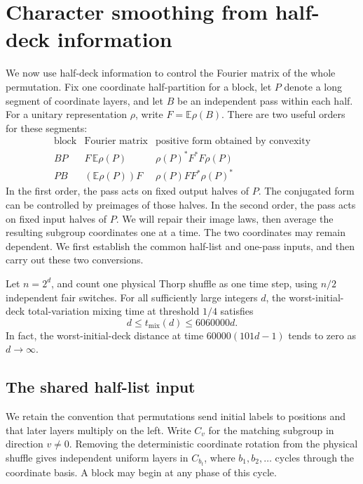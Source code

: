 \section{Character smoothing from half-deck information}
\label{frames:char:section}

We now use half-deck information to control the Fourier matrix of the
whole permutation. Fix one coordinate half-partition for a block, let
$P$ denote a long segment of coordinate layers, and let $B$ be an
independent pass within each half. For a unitary representation $\rho$,
write $F=\mathbb E\rho(B)$. There are two useful orders for these segments:
\[
\begin{array}{c|c|c}
\text{block}&\text{Fourier matrix}&
       \text{positive form obtained by convexity}\\
\hline
BP&F\,\mathbb E\rho(P)&\rho(P)^*F^*F\rho(P)\\
PB&(\mathbb E\rho(P))F&\rho(P)FF^*\rho(P)^*
\end{array}
\]
In the first order, the pass acts on fixed output halves of $P$.
The conjugated form can be controlled by preimages of those halves.
In the second order, the pass acts on fixed input halves of $P$.
We will repair their image laws, then average the resulting subgroup
coordinates one at a time. The two coordinates may remain dependent.
We first establish the common half-list and one-pass inputs, and then
carry out these two conversions.

\begin{theorem}\label{frames:char:main}
Let $n=2^d$, and count one physical Thorp shuffle as one time step, using
$n/2$ independent fair switches. For all sufficiently large integers $d$,
the worst-initial-deck total-variation mixing time at threshold $1/4$
satisfies
\[
 d\le t_{\mathrm{mix}}(d)\le 6060000d.
\]
In fact, the worst-initial-deck distance at time
$60000(101d-1)$ tends to zero as $d\to\infty$.
\end{theorem}

\subsection{The shared half-list input}
\label{frames:char:marginals}

We retain the convention that permutations send initial labels to
positions and that later layers multiply on the left. Write $C_v$ for
the matching subgroup in direction $v\ne0$. Removing the deterministic
coordinate rotation from the physical shuffle gives independent uniform
layers in $C_{b_t}$, where $b_1,b_2,\ldots$ cycles through the coordinate
basis. A block may begin at any phase of this cycle.

